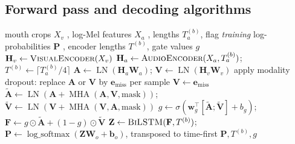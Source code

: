 \subsection{Forward pass and decoding algorithms}

\begin{algorithm}[H]
\caption{LipScribe forward pass (training and inference).}
\label{alg:forward}
\begin{algorithmic}[1]
\Require mouth crops $X_v$ , log-Mel features $X_a$ , lengths $T_a^{(b)}$, flag \textit{training}
\Ensure log-probabilities $\mathbf{P}$ , encoder lengths $T^{(b)}$, gate values $g$
\State $\mathbf{H}_v \gets \textsc{VisualEncoder}(X_v)$ 
\State $\mathbf{H}_a \gets \textsc{AudioEncoder}(X_a, T_a^{(b)})$; \quad $T^{(b)} \gets \lceil T_a^{(b)}/4\rceil$ 
\State $\mathbf{A} \gets \operatorname{LN}(\mathbf{H}_a\mathbf{W}_a)$; \quad $\mathbf{V} \gets \operatorname{LN}(\mathbf{H}_v\mathbf{W}_v)$
 apply modality dropout: replace $\mathbf{A}$ or $\mathbf{V}$ by $\mathbf{e}_{\text{miss}}$ per sample
 $\mathbf{V} \gets \mathbf{e}_{\text{miss}}$
\EndIf
\State $\tilde{\mathbf{A}} \gets \operatorname{LN}(\mathbf{A} + \operatorname{MHA}(\mathbf{A},\mathbf{V},\text{mask}))$; \quad
       $\tilde{\mathbf{V}} \gets \operatorname{LN}(\mathbf{V} + \operatorname{MHA}(\mathbf{V},\mathbf{A},\text{mask}))$
\State $g \gets \sigma(\mathbf{w}_g^\top[\tilde{\mathbf{A}};\tilde{\mathbf{V}}] + b_g)$; \quad $\mathbf{F} \gets g\odot\tilde{\mathbf{A}} + (1-g)\odot\tilde{\mathbf{V}}$
\State $\mathbf{Z} \gets \textsc{BiLSTM}(\mathbf{F}, T^{(b)})$; \quad $\mathbf{P} \gets \operatorname{log\_softmax}(\mathbf{Z}\mathbf{W}_o + \mathbf{b}_o)$, transposed to time-first
\State \Return $\mathbf{P}, T^{(b)}, g$
\end{algorithmic}
\end{algorithm}


